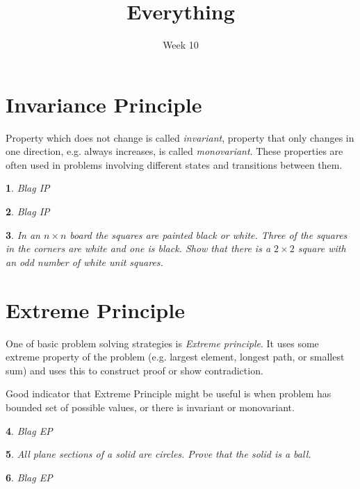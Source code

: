 \documentclass[12pt]{article}
\title{\textbf{Everything}}
\date{Week 10}
\newtheorem{problem}{}
\begin{document}
\maketitle

\section{Invariance Principle}

Property which does not change is called \emph{invariant}, property that only changes in one direction, e.g. always increases, is called \emph{monovariant}. These properties are often used in problems involving different states and transitions between them. 

\begin{problem}
Blag IP \end{problem}

\begin{problem}
Blag IP \end{problem}

\begin{problem}
In an $n \times n$ board the squares are painted black or white. Three of the squares in the corners are white and one is black. Show that there is a $2 \times 2$ square with an odd number of white unit squares.
 \end{problem}

\section{Extreme Principle}

One of basic problem solving strategies is \emph{Extreme principle}. It uses some extreme property of the problem (e.g. largest element, longest path, or smallest sum) and uses this to construct proof or show contradiction. 

Good indicator that Extreme Principle might be useful is when problem has bounded set of possible values, or there is invariant or monovariant.

\begin{problem}
Blag EP \end{problem}

\begin{problem}
All plane sections of a solid are circles. Prove that the solid is a ball.
\end{problem}

\begin{problem}
Blag EP \end{problem}
\end{document}
